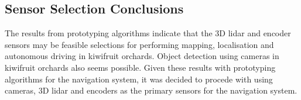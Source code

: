 \documentclass[preprint,authoryear,12pt]{elsarticle}
\begin{document}


    

\subsection{Sensor Selection Conclusions}
    The results from prototyping algorithms indicate that the 3D lidar and encoder sensors may be feasible selections for performing mapping, localisation and autonomous driving in kiwifruit orchards.
	Object detection using cameras in kiwifruit orchards also seems possible.
	Given these results with prototyping algorithms for the navigation system, it was decided to procede with using cameras, 3D lidar and encoders as the primary sensors for the navigation system.
	  
\end{document}
